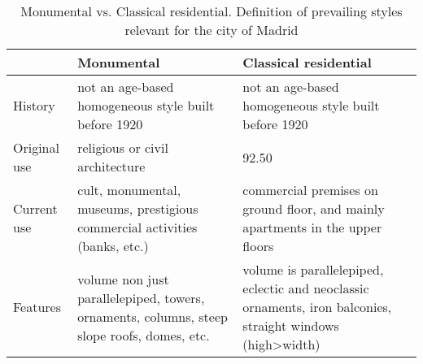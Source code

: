 \begin{table}[t]
   \centering
   {\tiny
   \begin{tabular}{m{1.5cm}|m{4.9cm}|m{4.9cm}} %
          & {\bf Monumental} & {\bf Classical residential} \\
          \hline\hline
         History       &  not an age-based homogeneous style built before 1920 
      &  not an age-based homogeneous style built before 1920 \\
      Original use       & religious or civil architecture  & 92.50 \\
      Current use       & cult, monumental, museums, prestigious commercial activities (banks, etc.)  & commercial premises on ground floor, and mainly apartments in the upper floors \\
      Features & volume non just parallelepiped, towers, ornaments, columns, steep slope roofs, domes, etc.     &  volume is parallelepiped, eclectic and neoclassic ornaments, iron balconies, straight windows (high>width) \\
   \end{tabular}
   }
   \vspace{1mm}
   \caption{Monumental vs. Classical residential. Definition of prevailing styles relevant for the city of Madrid}
   \label{tab:monumental_classical}
\end{table}

